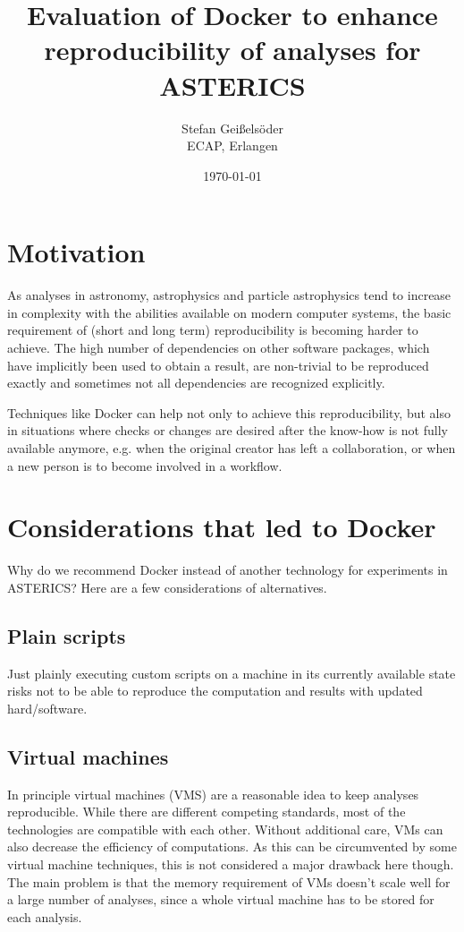\documentclass[a4paper, twoside, 11pt]{article}
\begin{document}
\title{Evaluation of Docker to enhance reproducibility of analyses for ASTERICS}
\author{Stefan Geißelsöder\\
ECAP, Erlangen}
\date{\today}
\maketitle

\section{Motivation}

As analyses in astronomy, astrophysics and particle astrophysics tend to increase in complexity 
with the abilities available on modern computer systems, 
the basic requirement of (short and long term) reproducibility is becoming harder to achieve. 
The high number of dependencies on other software packages, which have implicitly been used to obtain a result, 
are non-trivial to be reproduced exactly and sometimes not all dependencies are recognized explicitly. 

Techniques like Docker can help not only to achieve this reproducibility, 
but also in situations where checks or changes are desired after the know-how is not fully available anymore, 
e.g. when the original creator has left a collaboration, or when a new person is to become involved in a workflow. 

\section{Considerations that led to Docker}

Why do we recommend Docker instead of another technology for experiments in ASTERICS? 
Here are a few considerations of alternatives. 

\subsection{Plain scripts}

Just plainly executing custom scripts on a machine in its currently available state 
risks not to be able to reproduce the computation and results with updated hard/software. 


\subsection{Virtual machines}

In principle virtual machines (VMS) are a reasonable idea to keep analyses reproducible. 
While there are different competing standards, most of the technologies are compatible with each other. 
Without additional care, VMs can also decrease the efficiency of computations. 
As this can be circumvented by some virtual machine techniques, this is not considered a major drawback here though. 
The main problem is that the memory requirement of VMs doesn't scale well for a large number of analyses, 
since a whole virtual machine has to be stored for each analysis. 
\end{document}
